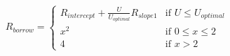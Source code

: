 \documentclass[preview]{standalone}
\begin{document}
\begin{align*}
{R_{borrow} = \begin{cases} R_{intercept} + \frac{U}{U_{optimal}}R_{slope1} & \text{if } U \leq U_{optimal} \\ x^2 & \text{if } 0 \leq x \leq 2 \\ 4 & \text{if } x > 2 \end{cases}}
\end{align*}
\end{document}
